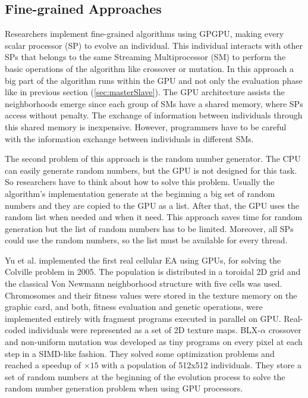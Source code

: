 \documentclass{article}
\begin{document}
\subsection{Fine-grained Approaches}

Researchers implement fine-grained algorithms using GPGPU, making
every scalar processor (SP) to evolve an individual. This individual
interacts with other SPs that belongs to the same Streaming
Multiprocessor (SM) to perform the basic operations of the algorithm
like crossover or mutation. In this approach a big part of the
algorithm runs within the GPU and not only the evaluation phase like
in previous section (\ref{sec:masterSlave}). The GPU architecture
assists the neighborhoods emerge since each group of SMs have a shared
memory, where SPs access without penalty. The exchange of information
between individuals through this shared memory is
inexpensive. However, programmers have to be careful with the
information exchange between individuals in different SMs.  

The second problem of this approach is the random number
generator. The CPU can easily generate random numbers, but the GPU is
not designed for this task. %
So researchers have to think about how to
solve this problem. Usually the algorithm's implementation generate at
the beginning a big set of random numbers and they are copied to the
GPU as a list. After that, the GPU uses the random list when needed
and when it need. This approach saves time for random generation but
the list of random numbers has to be limited. Moreover, all SPs could
use the random numbers, so the list must be available for every
thread.  


Yu et al. \cite{yu-parallel-2005} implemented the first real cellular EA using GPUs, for solving the Colville problem \cite{Ng:2005:DFF:1064290.1064296} in 2005. The population is distributed in a toroidal 2D grid and the classical Von Newmann neighborhood structure with five cells was used. Chromosomes and their fitness values were stored in the texture memory on the graphic card, and both, fitness evaluation and genetic operations, were implemented entirely with fragment programs executed in parallel on GPU. Real-coded individuals were represented as a set of 2D texture maps. BLX-$\alpha$ crossover and non-uniform mutation was developed as tiny programs on every pixel at each step in a SIMD-like fashion. They solved some optimization problems and reached a speedup of $\times15$ with a population of 512x512 individuals. They store a set of random numbers at the beginning of the evolution process to solve the random number generation problem when using GPU processors. 
\end{document}
